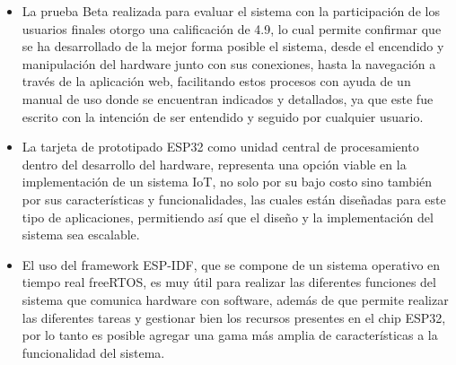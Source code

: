 \begin{itemize}
	\item La prueba Beta realizada para evaluar el sistema con la participación de los usuarios finales otorgo una calificación de 4.9, lo cual permite confirmar que se ha desarrollado de la mejor forma posible el sistema, desde el encendido y manipulación del hardware junto con sus conexiones, hasta la navegación a través de la aplicación web, facilitando estos procesos con ayuda de un manual de uso donde se encuentran indicados y detallados, ya que este fue escrito con la intención de ser entendido y seguido por cualquier usuario.\\
	
	\item La tarjeta de prototipado ESP32 como unidad central de procesamiento dentro del desarrollo del hardware, representa una opción viable en la implementación de un sistema IoT, no solo por su bajo costo sino también por sus características y funcionalidades, las cuales están diseñadas para este tipo de aplicaciones, permitiendo así que el diseño y la implementación del sistema sea escalable.\\
	
	\item El uso del framework ESP-IDF, que se compone de un sistema operativo en tiempo real freeRTOS, es muy útil para realizar las diferentes funciones del sistema que comunica hardware con software, además de que permite realizar las diferentes tareas y gestionar bien los recursos presentes en el chip ESP32, por lo tanto es posible agregar una gama más amplia de características a la funcionalidad del sistema.\\
	
\end{itemize}
